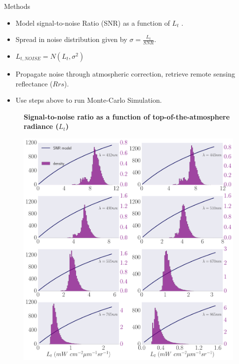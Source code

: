 \documentclass[final]{beamer}
\newlength{\onecolwid}
\begin{document}
\begin{frame}[t]
\begin{columns}[t]
\begin{column}{\onecolwid}

\begin{block}{Methods}
\begin{itemize}
\item Model signal-to-noise Ratio (SNR) as a function of $L_t$\cite{Barnes:1994} .
\item Spread in noise distribution given by $\sigma = \frac{L_t}{SNR}$.
\item $L_{t,NOISE} = N(L_t, \sigma^2)$
\item Propagate noise through atmospheric correction, retrieve remote sensing reflectance ($Rrs$).
\item Use steps above to run Monte-Carlo Simulation.
\end{itemize}
\end{block}
\begin{figure}
\centering
\textbf{Signal-to-noise ratio as a function of top-of-the-atmosphere radiance ($L_t$)}\par\medskip
\includegraphics[width=1.0\linewidth]{snrmodelLong.pdf}
\end{figure}


\end{column}
\end{columns}
\end{frame}
\end{document}
